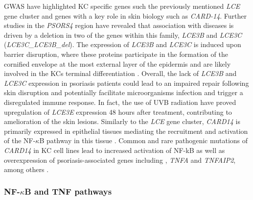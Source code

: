 GWAS have highlighted KC specific genes such the previously mentioned \textit{LCE} gene cluster and genes with a key role in skin biology such as \textit{CARD-14}. Further studies in the \textit{PSORS4} region have revealed that association with diseases is driven by a deletion in two of the genes within this family, \textit{LCE3B} and \textit{LCE3C} (\textit{LCE3C_LCE3B_del})\parencite{Cid2009}. The expression of \textit{LCE3B} and \textit{LCE3C} is induced upon barrier disruption, where these proteins participate in the formation of the cornified envelope at the most external layer of the epidermis and are likely involved in the KCs terminal differentiation \parencite{Bergboer2011}. Overall, the lack of \textit{LCE3B} and \textit{LCE3C} expression in psoriasis patients could lead to an impaired repair following skin disruption and potentially facilitate microorganisms infection and trigger a disregulated immune response. In fact, the use of UVB radiation have proved upregulation of \textit{LCE3E} expression 48 hours after treatment, contributing to amelioration of the skin lesions\parencite{Jackson2005}. %
Similarly to the \textit{LCE} gene cluster, \textit{CARD14} is primarily expressed in epithelial tissues mediating the recruitment and activation of the NF-$\kappa$B pathway in this tissue \parencite{Blonska2011}. Common and rare pathogenic mutations of \textit{CARD14} in KC cell lines lead to increased activation of NF-kB as well as overexpression of psoriasis-associated genes including , \textit{TNFA} and \textit{TNFAIP2}, among others \parencite{Jordan2012b}.



\subsubsection*{NF-$\kappa$B and TNF pathways}

